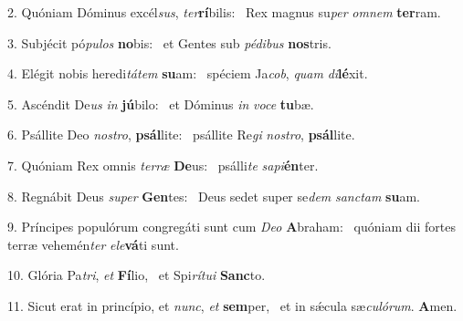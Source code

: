 2. Quóniam Dóminus excél\textit{sus}, \textit{ter}\textbf{rí}bilis: \ast\  Rex magnus su\textit{per} \textit{om}\textit{nem} \textbf{ter}ram.\

3. Subjécit pó\textit{pu}\textit{los} \textbf{no}bis: \ast\  et Gentes sub \textit{pé}\textit{di}\textit{bus} \textbf{nos}tris.\

4. Elégit nobis heredi\textit{tá}\textit{tem} \textbf{su}am: \ast\  spéciem Ja\textit{cob}, \textit{quam} \textit{di}\textbf{lé}xit.\

5. Ascéndit De\textit{us} \textit{in} \textbf{jú}bilo: \ast\  et Dóminus \textit{in} \textit{vo}\textit{ce} \textbf{tu}bæ.\

6. Psállite Deo \textit{nos}\textit{tro}, \textbf{psál}lite: \ast\  psállite Re\textit{gi} \textit{nos}\textit{tro}, \textbf{psál}lite.\

7. Quóniam Rex omnis \textit{ter}\textit{ræ} \textbf{De}us: \ast\  psálli\textit{te} \textit{sa}\textit{pi}\textbf{én}ter.\

8. Regnábit Deus \textit{su}\textit{per} \textbf{Gen}tes: \ast\  Deus sedet super se\textit{dem} \textit{sanc}\textit{tam} \textbf{su}am.\

9. Príncipes populórum congregáti sunt cum \textit{De}\textit{o} \textbf{A}braham: \ast\  quóniam dii fortes terræ vehemén\textit{ter} \textit{e}\textit{le}\textbf{vá}ti sunt.\

10. Glória Pa\textit{tri}, \textit{et} \textbf{Fí}lio, \ast\  et Spi\textit{rí}\textit{tu}\textit{i} \textbf{Sanc}to.\

11. Sicut erat in princípio, et \textit{nunc}, \textit{et} \textbf{sem}per, \ast\  et in sǽcula sæ\textit{cu}\textit{ló}\textit{rum}. \textbf{A}men.\

